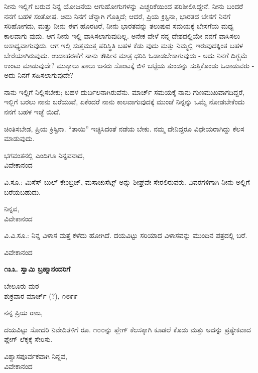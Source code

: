 ನೀನು ಇಲ್ಲಿಗೆ ಬರುವ ನಿನ್ನ ಯೋಜನೆಯ ಆಗುಹೋಗುಗಳನ್ನು ಎಚ್ಚರಿಕೆಯಿಂದ ಪರಿಶೀಲಿಸಿದ್ದೇನೆ. ನೀನು ಬಂದರೆ ನನಗೆ ಬಹಳ ಸಂತೋಷ. ಅದು ನಿನಗೆ ಚೆನ್ನಾಗಿ ಗೊತ್ತಿದೆ; ಆದರೆ, ಪ್ರಿಯ ಕ್ರಿಸ್ಟಿನಾ, ಭಾರತದ ಬೇಸಗೆ ನಿನಗೆ ಸರಿಹೋಗದು, ಮತ್ತು ನೀನು ಈಗ ಹೊರಟರೆ, ನೀನು ಭಾರತವನ್ನು ತಲುಪುವ ಸಮಯಕ್ಕೆ ಬೇಸಗೆಯ ಮಧ್ಯ ಕಾಲವಾಗು ವುದು. ಆಗ ನೀನು ಇಲ್ಲಿ ವಾಸಿಸಲಾಗುವುದಿಲ್ಲ. ಅನೇಕ ವೇಳೆ ನನ್ನ ದೇಶದಲ್ಲಿಯೇ ನನಗೆ ವಾಸಿಸಲು ಅಸಾಧ್ಯವಾಗುವುದು. ಆಗ ಇಲ್ಲಿ ಸುತ್ತಮುತ್ತ ಪರಿಸ್ಥಿತಿ ಬಹಳ ಕೆಡು ವುದು ಮತ್ತು ನಿಮ್ಮಲ್ಲಿ ಇರುವುದಕ್ಕಿಂತ ಬಹಳ ಬೇರೆಯಾಗಿರುವುದು. ಉದಾಹರಣೆಗೆ ನಾನು ಕೌಪೀನ ಮಾತ್ರ ಧರಿಸಿ ಓಡಾಡಬೇಕಾಗುವುದು - ಅದು ನಿನಗೆ ದಿಗ್ಭ್ರಮೆ ಉಂಟು ಮಾಡುವುದೇ? ಮುಕ್ಕಾಲು ಪಾಲು ಜನರು ಸೊಂಟಕ್ಕೆ ಬಿಳಿ ಬಟ್ಟೆಯ ತುಂಡನ್ನು ಸುತ್ತಿಕೊಂಡು ಓಡಾಡುವರು - ಅದು ನಿನಗೆ ಸಹಿಸಲಾಗುವುದೇ?

ನಾನು ಇಲ್ಲಿಗೆ ನಿಲ್ಲಿಸಬೇಕು; ಬಹಳ ದುರ್ಬಲನಾಗಿರುವೆನು. ಮಾರ್ಚ್ ಸಮಯಕ್ಕೆ ನಾನು ಗುಣಮುಖವಾಗದಿದ್ದರೆ, ಇಲ್ಲಿಗೆ ಬರಲು ನಾನು ಬರೆಯುವೆ, ಏಕೆಂದರೆ ನಾನು ಕಾಲವಾಗುವುದಕ್ಕೆ ಮುಂಚೆ ನಿನ್ನನ್ನು ಒಮ್ಮೆ ನೋಡಬೇಕೆಂದು ನನಗೆ ಬಹಳ ಇಚ್ಛೆ ಯಿದೆ.

ಚಿಂತಿಸಬೇಡ, ಪ್ರಿಯ ಕ್ರಿಸ್ಟಿನಾ. “ತಾಯಿ” ಇಚ್ಛಿಸಿದಂತೆ ನಡೆಯ ಬೇಕು. ನಮ್ಮ ದೇನಿದ್ದರೂ ವಿಧೇಯರಾಗಿದ್ದು ಕೆಲಸ ಮಾಡುವುದು.

\begin{flushright}
ಭಗವಂತನಲ್ಲಿ ಎಂದಿಗೂ ನಿನ್ನವನಾದ,\\ವಿವೇಕಾನಂದ
\end{flushright}

ವಿ.ಸೂ.: ಮಿಸೆಸ್ ಬುಲ್ ಕೇಂಬ್ರಿಜ್, ಮಸಾಚುಸೆಟ್ಸ್ ಅನ್ನು ಶೀಘ್ರವೇ ಸೇರಲಿರುವರು. ವಿವರಗಳಿಗಾಗಿ ನೀನು ಅಲ್ಲಿಗೆ ಬರೆಯಬಹುದು.

\begin{flushright}
ನಿನ್ನವ,\\ವಿವೇಕಾನಂದ
\end{flushright}

ವಿ.ವಿ.ಸೂ.: ನಿನ್ನ ವಿಳಾಸ ಮತ್ತೆ ಕಳೆದು ಹೋಗಿದೆ. ದಯವಿಟ್ಟು ಸರಿಯಾದ ವಿಳಾಸವನ್ನು ಮುಂದಿನ ಪತ್ರದಲ್ಲಿ ಬರೆ.

\begin{flushright}
ವಿವೇಕಾನಂದ
\end{flushright}

\begin{center}
\textbf{೧೩೩. ಸ್ವಾಮಿ ಬ್ರಹ್ಮಾನಂದರಿಗೆ}
\end{center}

\begin{flushright}
ಬೇಲೂರು ಮಠ\\ಶುಕ್ರವಾರ ಮಾರ್ಚ್ (?), ೧೮೯೯
\end{flushright}

ನನ್ನ ಪ್ರಿಯ ರಾಜ,

ದಯವಿಟ್ಟು ಸೋದರಿ ನಿವೇದಿತಳಿಗೆ ರೂ. ೧೦೦ನ್ನು ಪ್ಲೇಗ್ ಕೆಲಸಕ್ಕಾಗಿ ಕೂಡಲೆ ಕೊಡು ಮತ್ತು ಅದನ್ನು ಪ್ರತ್ಯೇಕವಾದ ಪ್ಲೇಗ್ ಲೆಕ್ಕಕ್ಕೆ ಸೇರಿಸು.

\begin{flushright}
ವಿಶ್ವಾಸಪೂರ್ವಕವಾಗಿ ನಿನ್ನವ,\\ವಿವೇಕಾನಂದ
\end{flushright}

